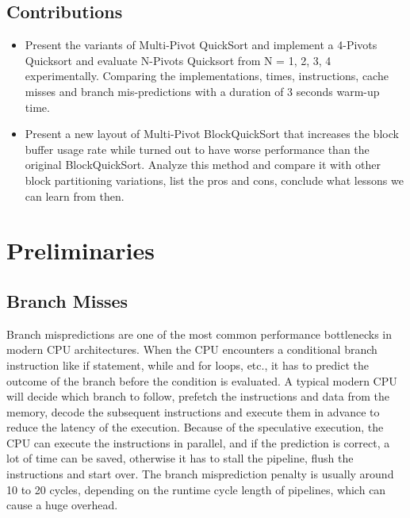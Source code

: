 \documentclass{article}
\begin{document}
\subsection{Contributions}
\begin{itemize}
    \item Present the variants of Multi-Pivot QuickSort and implement a 4-Pivots Quicksort and evaluate N-Pivots Quicksort from N = 1, 2, 3, 4 experimentally. 
        Comparing the implementations, times, instructions, cache misses and branch mis-predictions with a duration of 3 seconds warm-up time.
    \item Present a new layout of Multi-Pivot BlockQuickSort that increases the block buffer usage rate while turned out to have worse performance than the original BlockQuickSort. 
        Analyze this method and compare it with other block partitioning variations, list the pros and cons, conclude what lessons we can learn from then.
\end{itemize}

\section{Preliminaries}

\subsection{Branch Misses}
Branch mispredictions are one of the most common performance bottlenecks in modern CPU architectures. 
When the CPU encounters a conditional branch instruction like if statement, while and for loops, etc., it has to predict the outcome of the branch before the condition is evaluated.
A typical modern CPU will decide which branch to follow, prefetch the instructions and data from the memory, decode the subsequent instructions and execute them in advance to reduce the latency of the execution.
Because of the speculative execution, the CPU can execute the instructions in parallel, and if the prediction is correct, a lot of time can be saved, otherwise it has to stall the pipeline, flush the instructions and start over.
The branch misprediction penalty is usually around 10 to 20 cycles, depending on the runtime cycle length of pipelines, which can cause a huge overhead.
\end{document}
